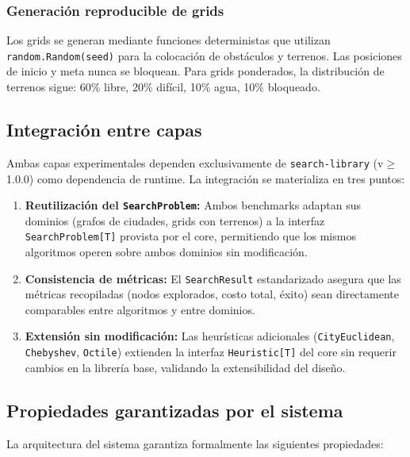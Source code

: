 \subsubsection{Generación reproducible de grids}

Los grids se generan mediante funciones deterministas que utilizan \texttt{random.Random(seed)} para la colocación de obstáculos y terrenos. Las posiciones de inicio y meta nunca se bloquean. Para grids ponderados, la distribución de terrenos sigue: 60\% libre, 20\% difícil, 10\% agua, 10\% bloqueado.

\subsection{Integración entre capas}

Ambas capas experimentales dependen exclusivamente de \texttt{search-library} (v$\geq$1.0.0) como dependencia de runtime. La integración se materializa en tres puntos:

\begin{enumerate}
    \item \textbf{Reutilización del \texttt{SearchProblem}:} Ambos benchmarks adaptan sus dominios (grafos de ciudades, grids con terrenos) a la interfaz \texttt{SearchProblem[T]} provista por el core, permitiendo que los mismos algoritmos operen sobre ambos dominios sin modificación.

    \item \textbf{Consistencia de métricas:} El \texttt{SearchResult} estandarizado asegura que las métricas recopiladas (nodos explorados, costo total, éxito) sean directamente comparables entre algoritmos y entre dominios.

    \item \textbf{Extensión sin modificación:} Las heurísticas adicionales (\texttt{CityEuclidean}, \texttt{Chebyshev}, \texttt{Octile}) extienden la interfaz \texttt{Heuristic[T]} del core sin requerir cambios en la librería base, validando la extensibilidad del diseño.
\end{enumerate}

\subsection{Propiedades garantizadas por el sistema}

La arquitectura del sistema garantiza formalmente las siguientes propiedades:

